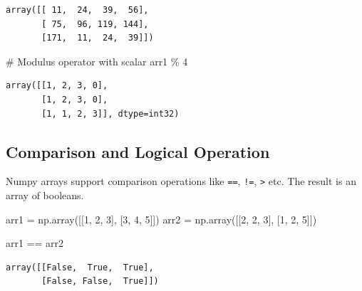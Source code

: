 \documentclass[
  letterpaper,
  DIV=11,
  numbers=noendperiod]{scrreprt}
\newenvironment{Shaded}{\begin{snugshade}}{\end{snugshade}}
\newcommand{\CommentTok}[1]{\textcolor[rgb]{0.37,0.37,0.37}{#1}}
\newcommand{\DecValTok}[1]{\textcolor[rgb]{0.68,0.00,0.00}{#1}}
\newcommand{\NormalTok}[1]{\textcolor[rgb]{0.00,0.23,0.31}{#1}}
\newcommand{\OperatorTok}[1]{\textcolor[rgb]{0.37,0.37,0.37}{#1}}
\begin{document}
\begin{verbatim}
array([[ 11,  24,  39,  56],
       [ 75,  96, 119, 144],
       [171,  11,  24,  39]])
\end{verbatim}

\begin{Shaded}
\begin{Highlighting}[]
\CommentTok{\# Modulus operator with scalar}
\NormalTok{arr1 }\OperatorTok{\%} \DecValTok{4}
\end{Highlighting}
\end{Shaded}

\begin{verbatim}
array([[1, 2, 3, 0],
       [1, 2, 3, 0],
       [1, 1, 2, 3]], dtype=int32)
\end{verbatim}

\hypertarget{comparison-and-logical-operation}{%
\subsection{Comparison and Logical
Operation}\label{comparison-and-logical-operation}}

Numpy arrays support comparison operations like \texttt{==},
\texttt{!=}, \texttt{\textgreater{}} etc. The result is an array of
booleans.

\begin{Shaded}
\begin{Highlighting}[]
\NormalTok{arr1 }\OperatorTok{=}\NormalTok{ np.array([[}\DecValTok{1}\NormalTok{, }\DecValTok{2}\NormalTok{, }\DecValTok{3}\NormalTok{], [}\DecValTok{3}\NormalTok{, }\DecValTok{4}\NormalTok{, }\DecValTok{5}\NormalTok{]])}
\NormalTok{arr2 }\OperatorTok{=}\NormalTok{ np.array([[}\DecValTok{2}\NormalTok{, }\DecValTok{2}\NormalTok{, }\DecValTok{3}\NormalTok{], [}\DecValTok{1}\NormalTok{, }\DecValTok{2}\NormalTok{, }\DecValTok{5}\NormalTok{]])}
\end{Highlighting}
\end{Shaded}

\begin{Shaded}
\begin{Highlighting}[]
\NormalTok{arr1 }\OperatorTok{==}\NormalTok{ arr2}
\end{Highlighting}
\end{Shaded}

\begin{verbatim}
array([[False,  True,  True],
       [False, False,  True]])
\end{verbatim}
\end{document}

